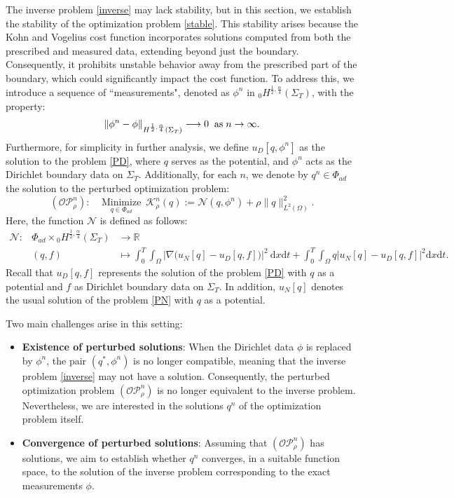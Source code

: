 \documentclass[a4paper,12pt,reqno,natbib]{amsart}
\newcommand{\dx} {\displaystyle\mathrm{d}x}
\newcommand{\dt} {\displaystyle\mathrm{d}t}
\begin{document}
The inverse problem \eqref{inverse} may lack stability, but in this section, we establish the stability of the optimization problem \eqref{stable}. This stability arises because the Kohn and Vogelius cost function incorporates solutions computed from both the prescribed and measured data, extending beyond just the boundary. Consequently, it prohibits unstable behavior away from the prescribed part of the boundary, which could significantly impact the cost function. To address this, we introduce a sequence of ``measurements", denoted as $\phi^n$ in ${}_0H^{\frac{1}{2},\frac{\alpha}{4} }\left(\Sigma_{T}\right)$, with the property:
\begin{align}\label{lim-seq-sat}
    \|\phi^n - \phi\|_{H^{\frac{1}{2},\frac{\alpha}{4} }\left(\Sigma_{T}\right)} \longrightarrow 0\;\; \hbox{as}\; n\rightarrow\infty.
\end{align}
Furthermore, for simplicity in further analysis, we define $u_D[q,\phi^n]$ as the solution to the problem \eqref{PD}, where $q$ serves as the potential, and $\phi^n$ acts as the Dirichlet boundary data on $\Sigma_T.$ Additionally, for each $n$, we denote by $q^n\in\Phi_{ad}$ the solution to the perturbed optimization problem: 
\begin{equation*} 
 (\mathcal{O}\mathcal{P}^n_\rho):\;\;\;   \displaystyle\operatorname*{Minimize}_{q\in\Phi_{ad}}\
\mathcal{K}_\rho^n( q):=\mathcal{N}(q,\phi^n)+\rho\|q\|_{L^2(\Omega)}^2.
\end{equation*}
Here, the function $\mathcal{N}$ is defined as follows:
$$\begin{array} {rclll}
 \mathcal{N}:
 &\Phi_{ad}\times {}_0H^{\frac{1}{2},\frac{\alpha}{4} }\left(\Sigma_{T}\right)& \longrightarrow \mathbb{R} \\
 &(q,f)& \longmapsto \displaystyle \int_0^T \int_{\Omega}\Big|\nabla\Big(
 u_N[q]- u_D[q,f]\Big)\Big|^2\ \dx \dt +\int_0^T\int_{\Omega}q\Big| u_N[q]- u_D[q,f]\Big|^2 \dx \dt. 
\end{array}$$
Recall that $u_D[q,f]$ represents the solution of the problem \eqref{PD} with $q$ as a potential and $f$ as Dirichlet boundary data on $\Sigma_T$. In addition, $u_N[q]$ denotes the usual solution of the problem \eqref{PN} with $q$ as a potential. 

Two main challenges arise in this setting:    
\begin{itemize}
    \item {\bf Existence of perturbed solutions}: When the Dirichlet data $\phi$ is replaced by $\phi^n$, the pair $(q^*, \phi^n)$ is no longer compatible, meaning that the inverse problem \eqref{inverse} may not have a solution. Consequently, the perturbed optimization problem $(\mathcal{O}\mathcal{P}_\rho^n)$ is no longer equivalent to the inverse problem. Nevertheless, we are interested in the solutions $q^n$ of the optimization problem itself.
    
    \item {\bf Convergence of perturbed solutions}: Assuming that $(\mathcal{O}\mathcal{P}_\rho^n)$ has solutions, we aim to establish whether $q^n$ converges, in a suitable function space, to the solution of the inverse problem corresponding to the exact measurements $\phi$.
\end{itemize}
\end{document}
